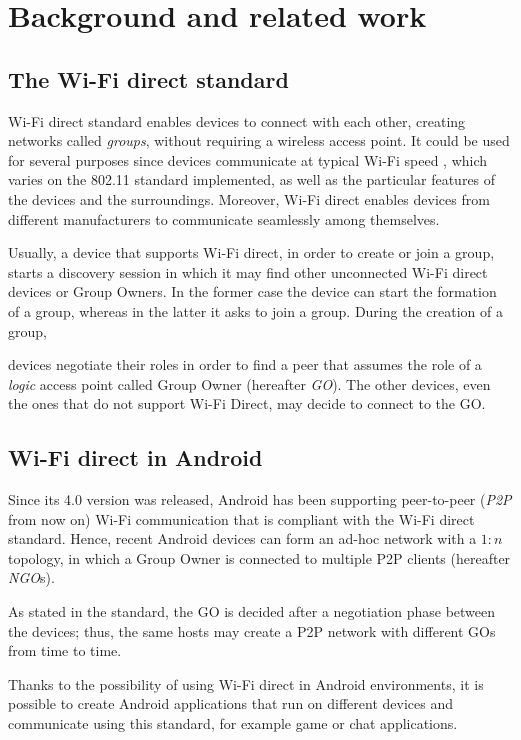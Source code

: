 \section{Background and related work} %
\subsection{The Wi-Fi direct standard}
Wi-Fi direct standard enables devices to connect with each other, creating 
networks called \textit{groups}, without requiring a wireless access point. It
could be used for several purposes since devices communicate at typical Wi-Fi
speed \cite{bib:wifiP2pspec}, which varies on the 802.11 standard implemented,
as well as the particular features of the devices and the surroundings.
Moreover, Wi-Fi direct enables devices from different manufacturers to
communicate seamlessly among themselves.

Usually, a device that supports Wi-Fi direct, in order to create or join a
group, starts a discovery session in which it may find other unconnected Wi-Fi
direct devices or Group Owners.
In the former case the device can start the formation of a group, whereas in
the latter it asks to join a group.
During the creation of a group,

devices negotiate their roles in order to find a peer that assumes the role of
a \emph{logic} access point called Group Owner (hereafter \textit{GO}). The
other devices, even the ones that do not support Wi-Fi Direct, may decide to
connect to the GO.

\subsection{Wi-Fi direct in Android}
Since its 4.0 version was released, Android has been supporting peer-to-peer 
(\textit{P2P} from now on) Wi-Fi communication that is compliant with the 
Wi-Fi direct standard\cite{bib:wifiP2pspec}. 
Hence, recent Android devices can form an ad-hoc network with a $1:n$ topology,
in which a Group Owner is connected to multiple P2P clients (hereafter \textit{NGO}s).

As stated in the standard, the GO is decided after a negotiation phase between
the devices; thus, the same hosts may create a P2P network with different GOs
from time to time.

Thanks to the possibility of using Wi-Fi direct in Android environments, it is
possible to create Android applications that run on different devices and
communicate using this standard, for example game or chat applications.

